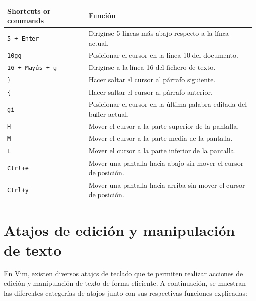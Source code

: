 \documentclass[
  doc,
  floatsintext,
  longtable,
  a4paper,
  nolmodern,
  notxfonts,
  notimes,
  12pt,
  colorlinks=true,linkcolor=blue,citecolor=blue,urlcolor=blue]{apa7}
\newcounter{none} %
\begin{document}
{\def\LTcaptype{none} %
\begin{longtable}[]{@{}
  >{\raggedright\arraybackslash}p{}
  >{\raggedright\arraybackslash}p{}@{}}
\toprule\noalign{}
\begin{minipage}[b]{\linewidth}\raggedright
Shortcuts or commands
\end{minipage} & \begin{minipage}[b]{\linewidth}\raggedright
Función
\end{minipage} \\
\midrule\noalign{}
\endhead
\bottomrule\noalign{}
\endlastfoot
\texttt{5\ +\ Enter} & Dirigirse 5 líneas más abajo respecto a la línea
actual. \\
\texttt{10gg} & Posicionar el cursor en la línea 10 del documento. \\
\texttt{16\ +\ Mayús\ +\ g} & Dirigirse a la línea 16 del fichero de
texto. \\
\texttt{\}} & Hacer saltar el cursor al párrafo siguiente. \\
\texttt{\{} & Hacer saltar el cursor al párrafo anterior. \\
\texttt{gi} & Posicionar el cursor en la última palabra editada del
buffer actual. \\
\texttt{H} & Mover el cursor a la parte superior de la pantalla. \\
\texttt{M} & Mover el cursor a la parte media de la pantalla. \\
\texttt{L} & Mover el cursor a la parte inferior de la pantalla. \\
\texttt{Ctrl+e} & Mover una pantalla hacia abajo sin mover el cursor de
posición. \\
\texttt{Ctrl+y} & Mover una pantalla hacia arriba sin mover el cursor de
posición. \\
\end{longtable}
}

\section{Atajos de edición y manipulación de
texto}\label{atajos-de-ediciuxf3n-y-manipulaciuxf3n-de-texto}

En Vim, existen diversos atajos de teclado que te permiten realizar
acciones de edición y manipulación de texto de forma eficiente. A
continuación, se muestran las diferentes categorías de atajos junto con
sus respectivas funciones explicadas:
\end{document}
